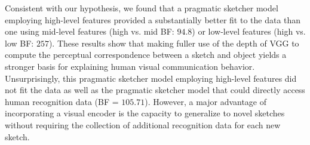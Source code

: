 \documentclass{svjour3}
\begin{document}
Consistent with our hypothesis, we found that a pragmatic sketcher model employing high-level features provided a substantially better fit to the data than one using mid-level features (high vs. mid BF: $94.8$) or low-level features (high vs. low BF: $257$).
These results show that making fuller use of the depth of VGG to compute the perceptual correspondence between a sketch and object yields a stronger basis for explaining human visual communication behavior.
Unsurprisingly, this pragmatic sketcher model employing high-level features did not fit the data as well as the pragmatic sketcher model that could directly access human recognition data (BF = $105.71$).
However, a major advantage of incorporating a visual encoder is the capacity to generalize to novel sketches without requiring the collection of additional recognition data for each new sketch.
\end{document}
